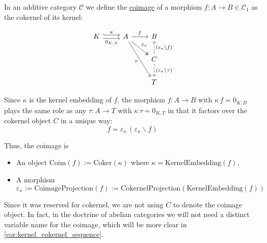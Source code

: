 \begin{definition}[Coimage]
In an additive category $\mathcal{C}$ we define the \ul{coimage} of a morphism $f : A \rightarrow B \in \mathcal{C}_{1}$ as the 
cokernel of its kernel:\\
\begin{minipage}{.06\textwidth} \phantom{} \end{minipage}
\begin{minipage}{.39\textwidth}
\[
\begin{tikzcd}[
  ampersand replacement=\&,
]
K \arrow[r, "\kappa", hook, shift left] \arrow[r, "{0_{K,A}}"', shift right] \& A \arrow[r, "f"] \arrow[rd, "{\varepsilon_{\kappa}}", two heads] \arrow[rdd, "\tau"'] \& B                                                                                                   \\
                                                                             \&                                                                            \& C \arrow[u, "({\varepsilon_{\kappa}}\backslash f)"', dashed] \arrow[d, "({\varepsilon_{\kappa}}\backslash \tau)", dashed] \\
                                                                             \&                                                                            \& T                                                                                                  
\end{tikzcd}
\]
\end{minipage}
\begin{minipage}{.49\textwidth}
Since $\kappa$ is the kernel embedding of $f$, the morphism $f : A \rightarrow B$ with $\kappa\,f = 0_{K,B}$ plays the
same role as any $\tau : A \rightarrow T$ with $\kappa\,\tau = 0_{K,T}$ in that it factors over the cokernel object $C$ in a
unique way:
\[
f = \varepsilon_{\kappa}\,(\varepsilon_{\kappa}\backslash f)
\]
\end{minipage}
\begin{minipage}{.06\textwidth} \phantom{} \end{minipage}

Thus, the coimage is
\begin{itemize}
\item An object $\mathrm{Coim}(f) := \mathrm{Coker}(\kappa)$ where $\kappa = \mathrm{KernelEmbedding}(f)$,
\item A morphism $\varepsilon_{\kappa} := \mathrm{CoimageProjection}(f) := \mathrm{CokernelProjection}(\mathrm{KernelEmbedding}(f))$
\end{itemize}
Since it was reserved for cokernel, we are not using $C$ to denote the coimage object. In fact, in the doctrine of abelian
categories we will not need a distinct variable name for the coimage, which will be more clear in \ref{cor:kernel_cokernel_sequence}.
\end{definition}

